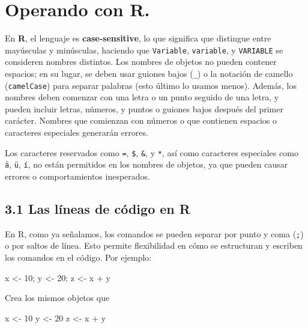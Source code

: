 \documentclass[
  letterpaper,
]{scrbook}
\newenvironment{Shaded}{\begin{snugshade}}{\end{snugshade}}
\newcommand{\DecValTok}[1]{\textcolor[rgb]{0.68,0.00,0.00}{#1}}
\newcommand{\NormalTok}[1]{\textcolor[rgb]{0.00,0.23,0.31}{#1}}
\newcommand{\OtherTok}[1]{\textcolor[rgb]{0.00,0.23,0.31}{#1}}
\newcommand{\SpecialCharTok}[1]{\textcolor[rgb]{0.37,0.37,0.37}{#1}}
\begin{document}
\hypertarget{operando-con-r.}{%
\section{Operando con R.}\label{operando-con-r.}}

En \textbf{R}, el lenguaje es \textbf{case-sensitive}, lo que significa
que distingue entre mayúsculas y minúsculas, haciendo que
\texttt{Variable}, \texttt{variable}, y \texttt{VARIABLE} se consideren
nombres distintos. Los nombres de objetos no pueden contener espacios;
en su lugar, se deben usar guiones bajos (\texttt{\_}) o la notación de
camello (\texttt{camelCase}) para separar palabras (esto último lo
usamos menos). Además, los nombres deben comenzar con una letra o un
punto seguido de una letra, y pueden incluir letras, números, y puntos o
guiones bajos después del primer carácter. Nombres que comienzan con
números o que contienen espacios o caracteres especiales generarán
errores.

Los caracteres reservados como \texttt{=}, \texttt{\$}, \texttt{\&}, y
\texttt{*}, así como caracteres especiales como \texttt{ä}, \texttt{ü},
\texttt{í}, no están permitidos en los nombres de objetos, ya que pueden
causar errores o comportamientos inesperados.

\hypertarget{las-luxedneas-de-cuxf3digo-en-r}{%
\subsection{3.1 Las líneas de código en
R}\label{las-luxedneas-de-cuxf3digo-en-r}}

En R, como ya señalamos, los comandos se pueden separar por punto y coma
(\texttt{;}) o por saltos de línea. Esto permite flexibilidad en cómo se
estructuran y escriben los comandos en el código. Por ejemplo:

\begin{Shaded}
\begin{Highlighting}[]
\NormalTok{x }\OtherTok{\textless{}{-}} \DecValTok{10}\NormalTok{; y }\OtherTok{\textless{}{-}} \DecValTok{20}\NormalTok{; z }\OtherTok{\textless{}{-}}\NormalTok{ x }\SpecialCharTok{+}\NormalTok{ y}
\end{Highlighting}
\end{Shaded}

Crea los mismos objetos que

\begin{Shaded}
\begin{Highlighting}[]
\NormalTok{x }\OtherTok{\textless{}{-}} \DecValTok{10}
\NormalTok{y }\OtherTok{\textless{}{-}} \DecValTok{20}
\NormalTok{z }\OtherTok{\textless{}{-}}\NormalTok{ x }\SpecialCharTok{+}\NormalTok{ y}
\end{Highlighting}
\end{Shaded}
\end{document}
